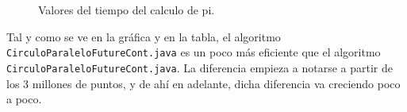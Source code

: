 \documentclass[12pt,letterpaper]{article}
\begin{document}
\begin{figure}[h]
	\begin{center}
		\caption{Valores del tiempo del calculo de pi.}
		\label{fig:Valores del calculo de pi}
	\end{center}
\end{figure}
\noindent
Tal y como se ve en la gráfica y en la tabla, el algoritmo \texttt{CirculoParaleloFutureCont.java} es un poco más eficiente que el algoritmo \texttt{CirculoParaleloFutureCont.java}. La diferencia empieza a notarse a partir de los 3 millones de puntos, y de ahí en adelante, dicha diferencia va creciendo poco a poco.
\end{document}
